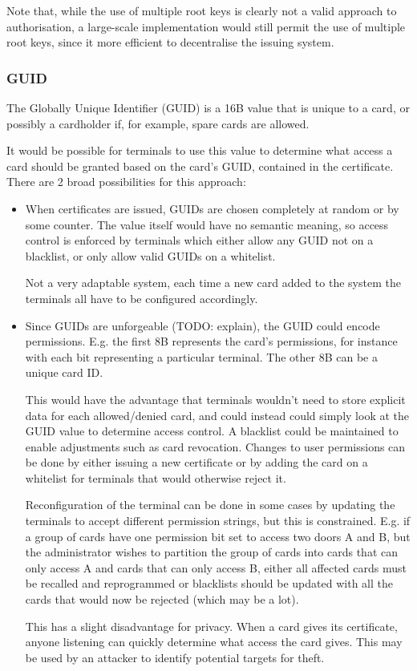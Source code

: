 \documentclass[12pt]{article}
\begin{document}
Note that, while the use of multiple root keys is clearly not a valid approach to authorisation, a large-scale implementation would still permit the use of multiple root keys, since it more efficient to decentralise the issuing system.

\subsubsection{GUID}
The Globally Unique Identifier (GUID) is a 16B value that is unique to a card, or possibly a cardholder if, for example, spare cards are allowed.

It would be possible for terminals to use this value to determine what access a card should be granted based on the card's GUID, contained in the certificate. There are 2 broad possibilities for this approach:
\begin{itemize}
	\item When certificates are issued, GUIDs are chosen completely at random or by some counter. The value itself would have no semantic meaning, so access control is enforced by terminals which either allow any GUID not on a blacklist, or only allow valid GUIDs on a whitelist.
	
	Not a very adaptable system, each time a new card added to the system the terminals all have to be configured accordingly.
	
	
	\item Since GUIDs are unforgeable (TODO: explain), the GUID could encode permissions. E.g. the first 8B represents the card's permissions, for instance with each bit representing a particular terminal. The other 8B can be a unique card ID.
	
	This would have the advantage that terminals wouldn't need to store explicit data for each allowed/denied card, and could instead could simply look at the GUID value to determine access control. A blacklist could be maintained to enable adjustments such as card revocation. Changes to user permissions can be done by either issuing a new certificate or by adding the card on a whitelist for terminals that would otherwise reject it. 
	
	Reconfiguration of the terminal can be done in some cases by updating the terminals to accept different permission strings, but this is constrained. E.g. if a group of cards have one permission bit set to access two doors A and B, but the administrator wishes to partition the group of cards into cards that can only access A and cards that can only access B, either all affected cards must be recalled and reprogrammed or blacklists should be updated with all the cards that would now be rejected (which may be a lot).
	
	This has a slight disadvantage for privacy. When a card gives its certificate, anyone listening can quickly determine what access the card gives. This may be used by an attacker to identify potential targets for theft.
\end{itemize}
\end{document}
